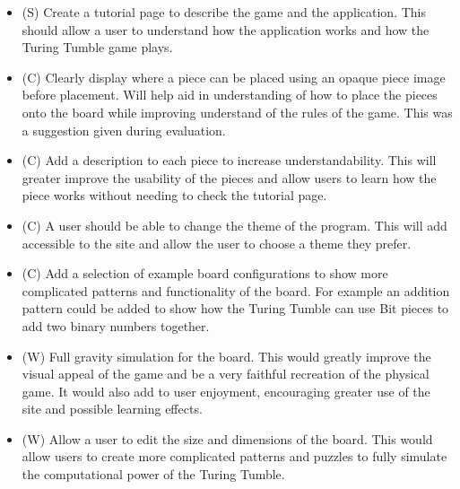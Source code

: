 \documentclass{l4proj}
\begin{document}
\begin{itemize}
    \item (S) Create a tutorial page to describe the game and the application. This should allow a user to understand how the application works and how the Turing Tumble game plays.
    \item (C) Clearly display where a piece can be placed using an opaque piece image before placement. Will help aid in understanding of how to place the pieces onto the board while improving understand of the rules of the game. This was a suggestion given during evaluation.
    \item (C) Add a description to each piece to increase understandability. This will greater improve the usability of the pieces and allow users to learn how the piece works without needing to check the tutorial page.
    \item (C) A user should be able to change the theme of the program. This will add accessible to the site and allow the user to choose a theme they prefer.
    \item (C) Add a selection of example board configurations to show more complicated patterns and functionality of the board. For example an addition pattern could be added to show how the Turing Tumble can use Bit pieces to add two binary numbers together.
    \item (W) Full gravity simulation for the board. This would greatly improve the visual appeal of the game and be a very faithful recreation of the physical game. It would also add to user enjoyment, encouraging greater use of the site and possible learning effects.
    \item (W) Allow a user to edit the size and dimensions of the board. This would allow users to create more complicated patterns and puzzles to fully simulate the computational power of the Turing Tumble.
\end{itemize}
\end{document}
